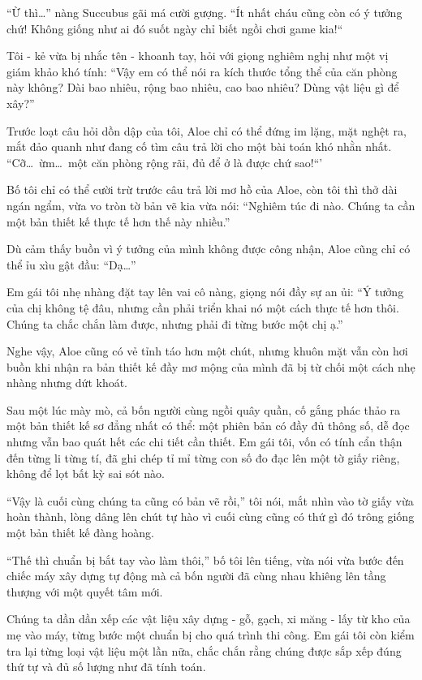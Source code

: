 \documentclass[../main.tex]{subfiles}
\begin{document}
``Ừ thì\dots'' nàng Succubus gãi má cười gượng. ``Ít nhất cháu cũng còn có ý tưởng chứ! Không giống như ai đó suốt ngày chỉ biết ngồi chơi game kia!``

Tôi - kẻ vừa bị nhắc tên - khoanh tay, hỏi với giọng nghiêm nghị như một vị giám khảo khó tính: ``Vậy em có thể nói ra kích thước tổng thể của căn phòng này không? Dài bao nhiêu, rộng bao nhiêu, cao bao nhiêu? Dùng vật liệu gì để xây?''

Trước loạt câu hỏi dồn dập của tôi, Aloe chỉ có thể đứng im lặng, mặt nghệt ra, mắt đảo quanh như đang cố tìm câu trả lời cho một bài toán khó nhằn nhất. ``Cỡ\dots\ ừm\dots\ một căn phòng rộng rãi, đủ để ở là được chứ sao!``'

Bố tôi chỉ có thể cười trừ trước câu trả lời mơ hồ của Aloe, còn tôi thì thở dài ngán ngẩm, vừa vo tròn tờ bản vẽ kia vừa nói: ``Nghiêm túc đi nào. Chúng ta cần một bản thiết kế thực tế hơn thế này nhiều.''

Dù cảm thấy buồn vì ý tưởng của mình không được công nhận, Aloe cũng chỉ có thể ỉu xìu gật đầu: ``Dạ\dots''

Em gái tôi nhẹ nhàng đặt tay lên vai cô nàng, giọng nói đầy sự an ủi: ``Ý tưởng của chị không tệ đâu, nhưng cần phải triển khai nó một cách thực tế hơn thôi. Chúng ta chắc chắn làm được, nhưng phải đi từng bước một chị ạ.''

Nghe vậy, Aloe cũng có vẻ tỉnh táo hơn một chút, nhưng khuôn mặt vẫn còn hơi buồn khi nhận ra bản thiết kế đầy mơ mộng của mình đã bị từ chối một cách nhẹ nhàng nhưng dứt khoát.

\ct

Sau một lúc mày mò, cả bốn người cùng ngồi quây quần, cố gắng phác thảo ra một bản thiết kế sơ đẳng nhất có thể: một phiên bản có đầy đủ thông số, dễ đọc nhưng vẫn bao quát hết các chi tiết cần thiết. Em gái tôi, vốn có tính cẩn thận đến từng li từng tí, đã ghi chép tỉ mỉ từng con số đo đạc lên một tờ giấy riêng, không để lọt bất kỳ sai sót nào.

``Vậy là cuối cùng chúng ta cũng có bản vẽ rồi,'' tôi nói, mắt nhìn vào tờ giấy vừa hoàn thành, lòng dâng lên chút tự hào vì cuối cùng cũng có thứ gì đó trông giống một bản thiết kế đàng hoàng.

``Thế thì chuẩn bị bắt tay vào làm thôi,'' bố tôi lên tiếng, vừa nói vừa bước đến chiếc máy xây dựng tự động mà cả bốn người đã cùng nhau khiêng lên tầng thượng với một quyết tâm mới.

Chúng ta dần dần xếp các vật liệu xây dựng - gỗ, gạch, xi măng - lấy từ kho của mẹ vào máy, từng bước một chuẩn bị cho quá trình thi công. Em gái tôi còn kiểm tra lại từng loại vật liệu một lần nữa, chắc chắn rằng chúng được sắp xếp đúng thứ tự và đủ số lượng như đã tính toán.
\end{document}

